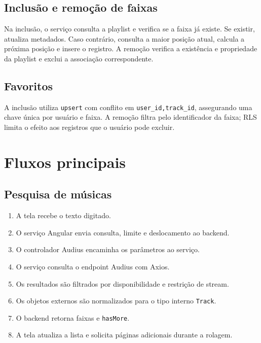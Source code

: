 \documentclass[12pt,a4paper,oneside]{report}
\begin{document}
\section{Inclusão e remoção de faixas}
Na inclusão, o serviço consulta a playlist e verifica se a faixa já existe. Se existir, atualiza metadados. Caso contrário, consulta a maior posição atual, calcula a próxima posição e insere o registro. A remoção verifica a existência e propriedade da playlist e exclui a associação correspondente.

\section{Favoritos}
A inclusão utiliza \texttt{upsert} com conflito em \texttt{user\_id,track\_id}, assegurando uma chave única por usuário e faixa. A remoção filtra pelo identificador da faixa; RLS limita o efeito aos registros que o usuário pode excluir.

\chapter{Fluxos principais}
\section{Pesquisa de músicas}
\begin{enumerate}
\item A tela recebe o texto digitado.
\item O serviço Angular envia consulta, limite e deslocamento ao backend.
\item O controlador Audius encaminha os parâmetros ao serviço.
\item O serviço consulta o endpoint Audius com Axios.
\item Os resultados são filtrados por disponibilidade e restrição de stream.
\item Os objetos externos são normalizados para o tipo interno \texttt{Track}.
\item O backend retorna faixas e \texttt{hasMore}.
\item A tela atualiza a lista e solicita páginas adicionais durante a rolagem.
\end{enumerate}
\end{document}
